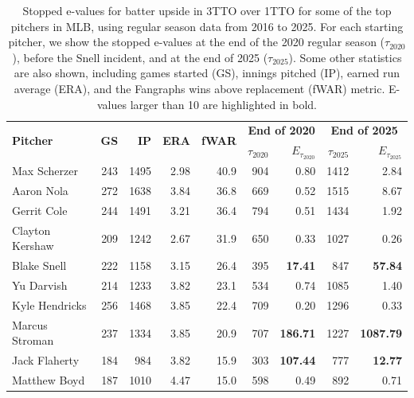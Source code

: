 \documentclass[12pt,twoside]{article}
\theoremstyle{plain}
\theoremstyle{definition}
\theoremstyle{remark}
\begin{document}
\begin{table}[t]
    \centering
    \begin{tabular}{l|rr|rr|rr|rr}
        \toprule
        \multirow{2}{*}{\bf Pitcher} & \multirow{2}{*}{\bf GS} & \multirow{2}{*}{\bf IP} & \multirow{2}{*}{\bf ERA} & \multirow{2}{*}{\bf fWAR} &
        \multicolumn{2}{c}{\bf End of 2020} & \multicolumn{2}{|c}{\bf End of 2025} \\
         &  &  &  &  & $\tau_{2020}$ & $E_{\tau_{2020}}$ & $\tau_{2025}$ & $E_{\tau_{2025}}$ \\
        \midrule
        Max Scherzer & 243 & 1495 & 2.98 & 40.9 &
        904 & 0.80 & 1412 & 2.84 \\
        Aaron Nola & 272 & 1638 & 3.84 & 36.8 &
        669 & 0.52 & 1515 & {8.67} \\
        Gerrit Cole & 244 & 1491 & 3.21 & 36.4 & 
        794 & 0.51 & 1434 & 1.92 \\
        Clayton Kershaw & 209 & 1242 & 2.67 & 31.9 & 
        650 & 0.33 & 1027 & 0.26 \\
        Blake Snell & 222 & 1158 & 3.15 & 26.4 & 
        395 & \bf 17.41 & 847 & \bf 57.84 \\
        Yu Darvish & 214 & 1233 & 3.82 & 23.1 &  
        534 & 0.74 & 1085 & 1.40 \\
        Kyle Hendricks & 256 & 1468 & 3.85 & 22.4 & 
        709 & 0.20 & 1296 & 0.33 \\
        Marcus Stroman & 237 & 1334 & 3.85 & 20.9 & 
        707 & \bf 186.71 & 1227 & \bf 1087.79 \\
        Jack Flaherty & 184 & 984 & 3.82 & 15.9 & 
        303 & \bf 107.44 & 777 & \bf 12.77 \\
        Matthew Boyd & 187 & 1010 & 4.47 & 15.0 & 
        598 & 0.49 & 892 & 0.71 \\
        \bottomrule
    \end{tabular}
    \caption{Stopped e-values for batter upside in 3TTO over 1TTO for some of the top pitchers in MLB, using regular season data from 2016 to 2025. For each starting pitcher, we show the stopped e-values at the end of the 2020 regular season ($\tau_{2020}$), before the Snell incident, and at the end of 2025 ($\tau_{2025}$). Some other statistics are also shown, including games started (GS), innings pitched (IP), earned run average (ERA), and the Fangraphs wins above replacement (fWAR) metric. E-values larger than 10 are highlighted in bold.}
    \label{tbl:evalues_top_pitchers}
\end{table}
\end{document}
